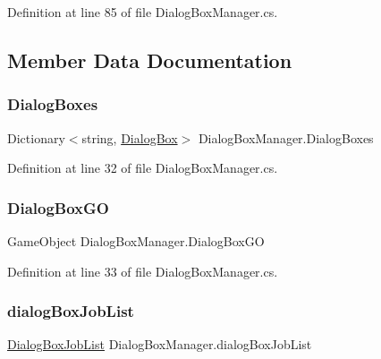 Definition at line 85 of file Dialog\+Box\+Manager.\+cs.



\subsection{Member Data Documentation}
\mbox{\label{class_dialog_box_manager_aee2041e576481fc9baf5bd9b916151b4}} 
\subsubsection{\texorpdfstring{Dialog\+Boxes}{DialogBoxes}}
{\footnotesize\ttfamily Dictionary$<$string, \hyperlink{class_dialog_box}{Dialog\+Box}$>$ Dialog\+Box\+Manager.\+Dialog\+Boxes}



Definition at line 32 of file Dialog\+Box\+Manager.\+cs.

\mbox{\label{class_dialog_box_manager_a028978852d9e4a722141040ee022157e}} 
\subsubsection{\texorpdfstring{Dialog\+Box\+GO}{DialogBoxGO}}
{\footnotesize\ttfamily Game\+Object Dialog\+Box\+Manager.\+Dialog\+Box\+GO}



Definition at line 33 of file Dialog\+Box\+Manager.\+cs.

\mbox{\label{class_dialog_box_manager_ad3e26fa78eba8fb93d1b588c6473f8fb}} 
\subsubsection{\texorpdfstring{dialog\+Box\+Job\+List}{dialogBoxJobList}}
{\footnotesize\ttfamily \hyperlink{class_dialog_box_job_list}{Dialog\+Box\+Job\+List} Dialog\+Box\+Manager.\+dialog\+Box\+Job\+List}



